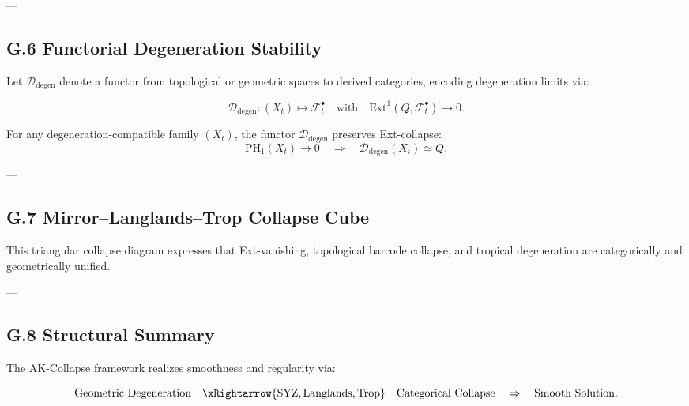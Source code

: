 \documentclass[11pt]{article}
\begin{document}
---

\subsection*{G.6 Functorial Degeneration Stability}

Let $\mathcal{D}_{\mathrm{degen}}$ denote a functor from topological or geometric spaces to derived categories,  
encoding degeneration limits via:

\[
\mathcal{D}_{\mathrm{degen}}: (X_t) \longmapsto \mathcal{F}_t^\bullet
\quad \text{with} \quad \mathrm{Ext}^1(Q, \mathcal{F}^\bullet_t) \to 0.
\]

\begin{axiom}
For any degeneration-compatible family $(X_t)$, the functor $\mathcal{D}_{\mathrm{degen}}$ preserves Ext-collapse:
\[
\mathrm{PH}_1(X_t) \to 0 
\quad \Rightarrow \quad 
\mathcal{D}_{\mathrm{degen}}(X_t) \simeq Q.
\]
\end{axiom}

---

\subsection*{G.7 Mirror–Langlands–Trop Collapse Cube}

\begin{center}
\end{center}

This triangular collapse diagram expresses that Ext-vanishing, topological barcode collapse,  
and tropical degeneration are categorically and geometrically unified.

---

\subsection*{G.8 Structural Summary}

The AK-Collapse framework realizes smoothness and regularity via:

\[
\text{Geometric Degeneration}
\quad \xRightarrow{\mathrm{SYZ}, \mathrm{Langlands}, \mathrm{Trop}}
\quad 
\text{Categorical Collapse}
\quad \Rightarrow \quad
\text{Smooth Solution}.
\]
\end{document}

